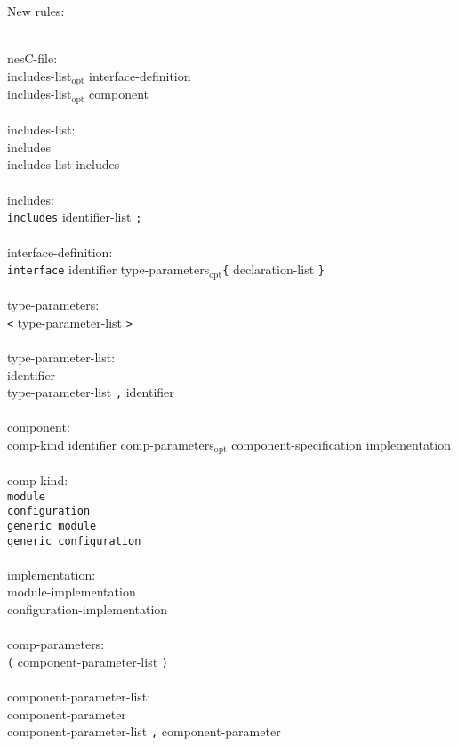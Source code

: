 \documentclass[11pt,letterpaper]{article}
\newcommand{\kw}[1]{{\tt #1}}
\newcommand{\opt}{$_{\mbox{opt}}$\xspace}
\newcommand{\grammarindent}{\hspace*{2cm}\= \\ \kill}
\begin{document}
New rules: \em \begin{tabbing}
\grammarindent
nesC-file: \\
\>	includes-list\opt interface-definition\\
\>	includes-list\opt component\\
\\
includes-list:\\
\>	includes\\
\>	includes-list includes\\
\\
includes:\\
\>	\kw{includes} identifier-list \kw{;}\\
\\
interface-definition:\\
\>	\kw{interface} identifier type-parameters\opt\kw{\{} declaration-list \kw{\}}\\
\\
type-parameters:\\
\>	\kw{<} type-parameter-list \kw{>}\\
\\
type-parameter-list:\\
\>	identifier\\
\>	type-parameter-list \kw{,} identifier\\
\\
component:\\
\>	comp-kind identifier comp-parameters\opt component-specification implementation\\
\\
comp-kind:\\
\>	\kw{module}\\
\>	\kw{configuration}\\
\>	\kw{generic module}\\
\>	\kw{generic configuration}\\
\\
implementation:\\
\>	module-implementation\\
\>	configuration-implementation\\
\\
comp-parameters:\\
\>	\kw{(} component-parameter-list \kw{)}\\
\\
component-parameter-list:\\
\>	component-parameter\\
\>	component-parameter-list \kw{,} component-parameter\\

\end{tabbing}
\end{document}
